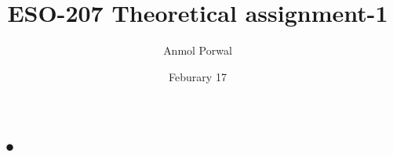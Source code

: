\documentclass{article}
\title{ESO-207 Theoretical assignment-1}
\author{Anmol Porwal}
\date{Feburary 17}
\begin{document}
\maketitle
\section{•}
\end{document}
